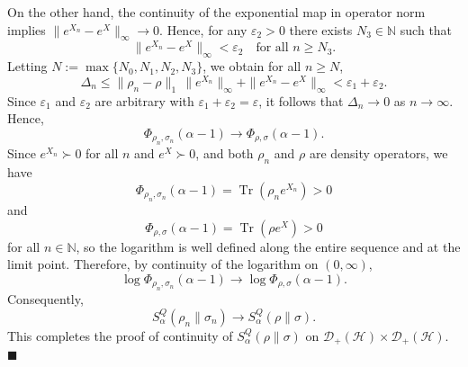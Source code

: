 \documentclass[10pt,a4paper]{amsart}
\renewenvironment{proof}{\noindent{\bfseries Proof.}}{\hfill$\blacksquare$}
\begin{document}
\begin{proof}
On the other hand, the continuity of the exponential map in operator norm implies
$\|e^{X_n}-e^{X}\|_{\infty}\to 0$. Hence, for any $\varepsilon_2>0$ there exists 
$N_3\in\mathbb{N}$ such that
\begin{equation}
    \|e^{X_n}-e^{X}\|_{\infty} < \varepsilon_2
    \quad \text{for all } n\ge N_3.
\end{equation}
Letting $N := \max\{N_0, N_1, N_2, N_3\}$, we obtain for all $n\ge N$,
\begin{equation}
    \Delta_n \le \|\rho_n-\rho\|_1\,\|e^{X_n}\|_{\infty}+
    \|e^{X_n}-e^{X}\|_{\infty}<\varepsilon_1+\varepsilon_2.
\end{equation}
Since $\varepsilon_1$ and $\varepsilon_2$ are arbitrary with
$\varepsilon_1+\varepsilon_2=\varepsilon$, it follows that
$\Delta_n\to 0$ as $n\to\infty$. Hence,
\[
    \Phi_{\rho_n,\sigma_n}(\alpha-1)
    \longrightarrow
    \Phi_{\rho,\sigma}(\alpha-1).
\]
Since $e^{X_n}\succ 0$ for all $n$ and $e^X\succ 0$, and both $\rho_n$ and $\rho$
are density operators, we have
\begin{equation}
    \Phi_{\rho_n,\sigma_n}(\alpha-1)=\operatorname{Tr}(\rho_n e^{X_n})>0
\end{equation}
and
\begin{equation}
     \Phi_{\rho,\sigma}(\alpha-1)=\operatorname{Tr}(\rho e^{X})>0
\end{equation}
for all $n\in\mathbb{N}$, so the logarithm is well defined along the entire sequence and at the limit point. Therefore, by continuity of the logarithm on
\((0,\infty)\),
\[
\log\Phi_{\rho_n,\sigma_n}(\alpha-1)
\longrightarrow
\log\Phi_{\rho,\sigma}(\alpha-1).
\]
Consequently,
\[
S_\alpha^Q(\rho_n\|\sigma_n)
\longrightarrow
S_\alpha^Q(\rho\|\sigma).
\]
This completes the proof of continuity of $S^Q_\alpha(\rho\|\sigma)$
on $\mathcal{D}_+(\mathcal{H}) \times \mathcal{D}_+(\mathcal{H})$.
\end{proof}
\end{document}

